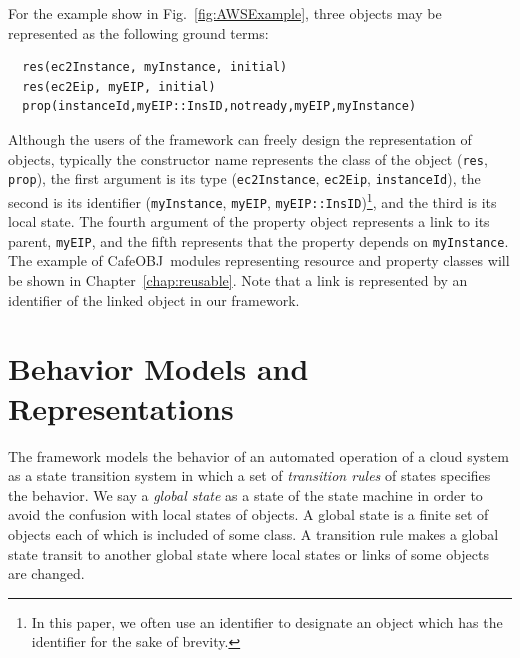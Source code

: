 \documentclass[12pt]{report}
\newcommand{\cafeobj}{{\sf CafeOBJ}~}
\begin{document}
For the example show in Fig.~\ref{fig:AWSExample}, three objects may
be represented as the following ground terms:
\small
\begin{verbatim}
  res(ec2Instance, myInstance, initial)
  res(ec2Eip, myEIP, initial)
  prop(instanceId,myEIP::InsID,notready,myEIP,myInstance)
\end{verbatim}
\normalsize
Although the users of the framework can freely design the
representation of objects, typically the constructor name represents
the class of the object ({\tt res}, {\tt prop}), the first argument is
its type ({\tt ec2Instance}, {\tt ec2Eip}, {\tt instanceId}), the
second is its identifier ({\tt myInstance}, {\tt myEIP},
{\tt myEIP::InsID})\footnote{In this paper, we often use an identifier
  to designate an object which has the identifier for the sake of
  brevity.}, and the third is its local state. The fourth argument of the
property object represents a link to its parent, {\tt myEIP}, and the
fifth represents that the property depends on {\tt myInstance}. The
example of \cafeobj modules representing resource and property classes
will be shown in Chapter~\ref{chap:reusable}.
Note that a link is represented by an identifier of the linked object
in our framework.
\section{Behavior Models and Representations}
\label{sec:behaviormodel}
The framework models the behavior of an automated operation of a cloud
system as a state transition system in which a set of {\it transition rules} of
states specifies the behavior. We say a {\it global state} as a state
of the state machine in order to avoid the confusion with local states
of objects. A global state is a finite set of objects each of which is
included of some class. A transition rule makes a global state transit
to another global state where local states or links of some objects
are changed.
\end{document}
